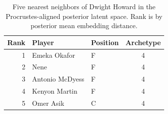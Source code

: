 \begin{table}[htbp]
  \centering\small
  \begin{tabular}{rllc}
    \toprule
    Rank & Player & Position & Archetype \\
    \midrule
    1 & Emeka Okafor & F & 4 \\
    2 & Nene & F & 4 \\
    3 & Antonio McDyess & F & 4 \\
    4 & Kenyon Martin & F & 4 \\
    5 & Omer Asik & C & 4 \\
    \bottomrule
  \end{tabular}
  \caption{Five nearest neighbors of Dwight Howard in the Procrustes-aligned posterior latent space. Rank is by posterior mean embedding distance.}
  \label{tab:Dwight_Howard_neighbors}
\end{table}

